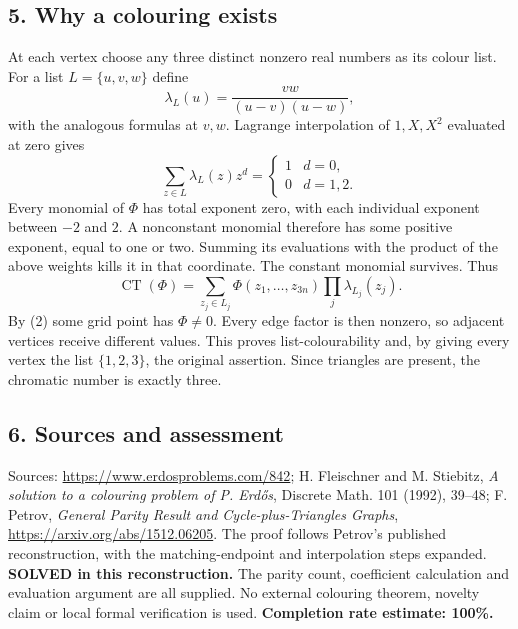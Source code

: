 \subsection*{5. Why a colouring exists}
At each vertex choose any three distinct nonzero real numbers as its colour list. For a list $L=\{u,v,w\}$ define
\[
 \lambda_L(u)=\frac{vw}{(u-v)(u-w)},
\]
with the analogous formulas at $v,w$. Lagrange interpolation of $1,X,X^2$ evaluated at zero gives
\[
 \sum_{z\in L}\lambda_L(z)z^d=
 \begin{cases}1&d=0,\\0&d=1,2.\end{cases}
\]
Every monomial of $\Phi$ has total exponent zero, with each individual exponent between $-2$ and $2$. A nonconstant monomial therefore has some positive exponent, equal to one or two. Summing its evaluations with the product of the above weights kills it in that coordinate. The constant monomial survives. Thus
\[
 \operatorname{CT}(\Phi)=
 \sum_{z_j\in L_j}\Phi(z_1,\ldots,z_{3n})\prod_j\lambda_{L_j}(z_j).
\]
By (2) some grid point has $\Phi\ne0$. Every edge factor is then nonzero, so adjacent vertices receive different values. This proves list-colourability and, by giving every vertex the list $\{1,2,3\}$, the original assertion. Since triangles are present, the chromatic number is exactly three.
\subsection*{6. Sources and assessment}
Sources: \url{https://www.erdosproblems.com/842}; H. Fleischner and M. Stiebitz, \emph{A solution to a colouring problem of P. Erd\H{o}s}, Discrete Math. 101 (1992), 39--48; F. Petrov, \emph{General Parity Result and Cycle-plus-Triangles Graphs}, \url{https://arxiv.org/abs/1512.06205}. The proof follows Petrov's published reconstruction, with the matching-endpoint and interpolation steps expanded.
\textbf{SOLVED in this reconstruction.} The parity count, coefficient calculation and evaluation argument are all supplied. No external colouring theorem, novelty claim or local formal verification is used.
\textbf{Completion rate estimate: 100\%.}
